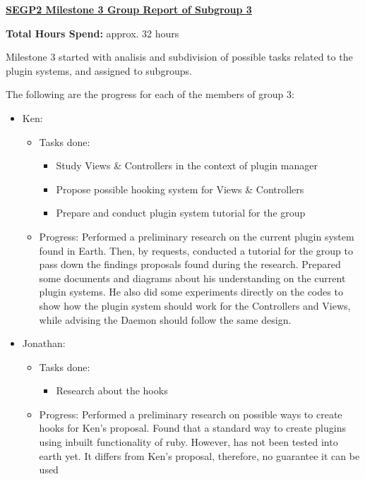 \documentclass{letter}
\begin{document}
{\large \textbf{\underline{SEGP2 Milestone 3 Group Report of Subgroup 3}}}

\textbf{Total Hours Spend:} approx. 32 hours

Milestone 3 started with analisis and subdivision of possible tasks related to the plugin systems, and assigned to subgroups.

The following are the progress for each of the members of group 3:

\begin{itemize}
   \item Ken:
      \begin{itemize}
         \item Tasks done:
            \begin{itemize}
             \item Study Views \& Controllers in the context of plugin manager
             \item Propose possible hooking system for Views \& Controllers
             \item Prepare and conduct plugin system tutorial for the group
            \end{itemize}

         \item Progress: Performed a preliminary research on the current plugin system found in Earth. Then, by requests, conducted a tutorial for the group to pass down the findings proposals found during the research. Prepared some documents and diagrams about his understanding on the current plugin systems. He also did some experiments directly on the codes to show how the plugin system should work for the Controllers and Views, while advising the Daemon should follow the same design. 
      \end{itemize}

         
    \item Jonathan:
        \begin{itemize}
         \item Tasks done:
            \begin{itemize}
             \item Research about the hooks
             \end{itemize}
             
         \item Progress: Performed a preliminary research on possible ways to create hooks for Ken's proposal.  Found that a standard way to create plugins using inbuilt functionality of ruby.  However, has not been tested into earth yet.  It differs from Ken's proposal, therefore, no guarantee it can be used
        \end{itemize}
        
        
%        
        
     \end{itemize}
 
 
\end{document}
